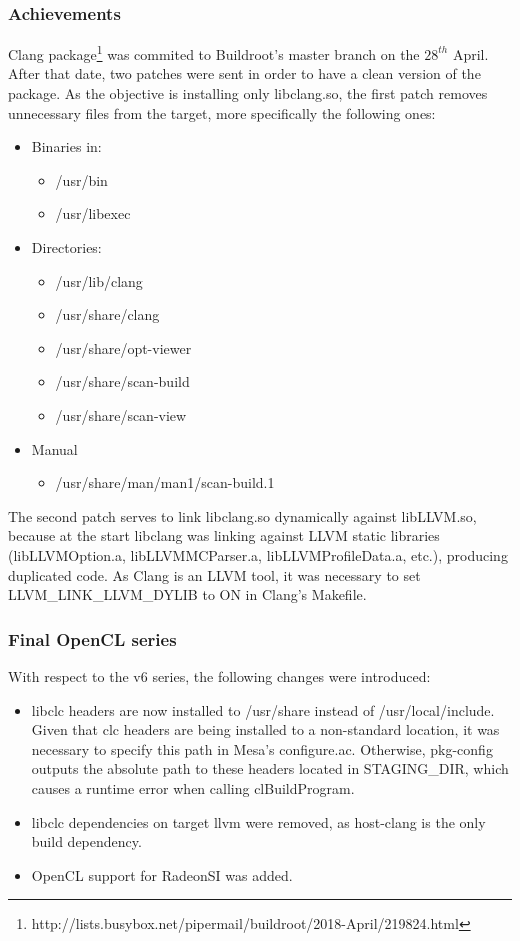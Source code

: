 \documentclass[12pt,a4paper,oneside]{article}
\begin{document}
\subsubsection*{Achievements}
Clang package\footnote{http://lists.busybox.net/pipermail/buildroot/2018-April/219824.html}
was commited to Buildroot's master branch on the $28^{th}$ April. After that date,
two patches were sent in order to have a clean version of the package. As the
objective is installing only libclang.so, the first patch removes unnecessary files
from the target, more specifically the following ones:
\begin{itemize}
  \item Binaries in:
  \begin{itemize}
    \item /usr/bin
    \item /usr/libexec
  \end{itemize}
  \item Directories:
  \begin{itemize}
    \item /usr/lib/clang
    \item /usr/share/clang
    \item /usr/share/opt-viewer
    \item /usr/share/scan-build
    \item /usr/share/scan-view
  \end{itemize}
  \item Manual
  \begin{itemize}
    \item /usr/share/man/man1/scan-build.1
  \end{itemize}
\end{itemize}

The second patch serves to link libclang.so dynamically against libLLVM.so,
because at the start libclang was linking against LLVM static libraries
(libLLVMOption.a, libLLVMMCParser.a, libLLVMProfileData.a, etc.), producing duplicated
code. As Clang is an LLVM tool, it was necessary to set LLVM\_LINK\_LLVM\_DYLIB
to ON in Clang's Makefile.

\subsubsection*{Final OpenCL series}
With respect to the v6 series, the following changes were introduced:
\begin{itemize}
  \item libclc headers are now installed to /usr/share instead of /usr/local/include.
  Given that clc headers are being installed to a non-standard location, it was
  necessary to specify this path in Mesa's configure.ac. Otherwise, pkg-config
  outputs the absolute path to these headers located in STAGING\_DIR, which causes
  a runtime error when calling clBuildProgram.
  \item libclc dependencies on target llvm were removed, as host-clang is the
  only build dependency.
  \item OpenCL support for RadeonSI was added.
\end{itemize}
\end{document}
